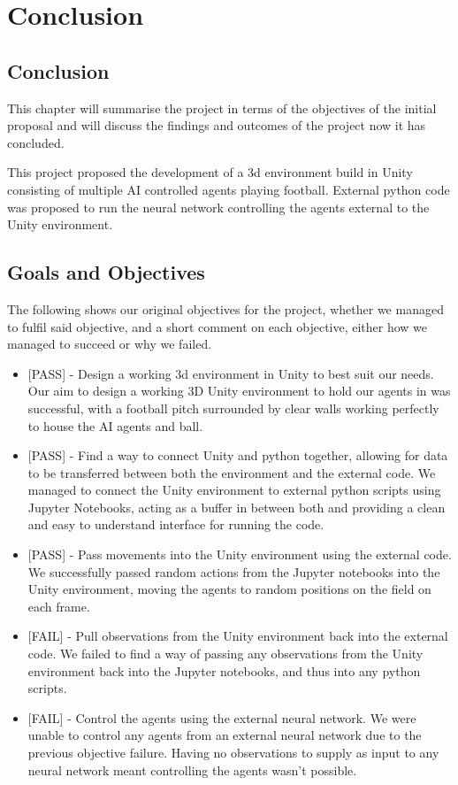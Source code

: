 
\chapter{Conclusion}

\section{Conclusion}
This chapter will summarise the project in terms of the objectives of the initial proposal and will discuss the findings and outcomes of the project now it has concluded.

This project proposed the development of a 3d environment build in Unity consisting of multiple AI controlled agents playing football. External python code was proposed to run the neural network controlling the agents external to the Unity environment. 

\section{Goals and Objectives}

The following shows our original objectives for the project, whether we managed to fulfil said objective, and a short comment on each objective, either how we managed to succeed or why we failed.

\begin{itemize}
    \item{[PASS] - Design a working 3d environment in Unity to best suit our needs.
Our aim to design a working 3D Unity environment to hold our agents in was successful, with a football pitch surrounded by clear walls working perfectly to house the AI agents and ball.}

    \item{[PASS] - Find a way to connect Unity and python together, allowing for data to be transferred between both the environment and the external code.
We managed to connect the Unity environment to external python scripts using Jupyter Notebooks, acting as a buffer in between both and providing a clean and easy to understand interface for running the code.}

    \item{[PASS] - Pass movements into the Unity environment using the external code.
We successfully passed random actions from the Jupyter notebooks into the Unity environment, moving the agents to random positions on the field on each frame.}

    \item{[FAIL] - Pull observations from the Unity environment back into the external code.
We failed to find a way of passing any observations from the Unity environment back into the Jupyter notebooks, and thus into any python scripts.}

    \item{[FAIL] - Control the agents using the external neural network.
We were unable to control any agents from an external neural network due to the previous objective failure. Having no observations to supply as input to any neural network meant controlling the agents wasn't possible.}
\end{itemize}

